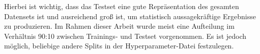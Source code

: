 Hierbei ist wichtig, dass das Testset eine gute Repräsentation des gesamten Datensets ist 
und ausreichend groß ist, um statistisch aussagekräftige Ergebnisse zu produzieren.
Im Rahmen dieser Arbeit wurde meist eine Aufteilung im Verhältnis 90:10 zwischen Trainings- und Testset vorgenommen.
Es ist jedoch möglich, beliebige andere Splits in der Hyperparameter-Datei festzulegen.




















